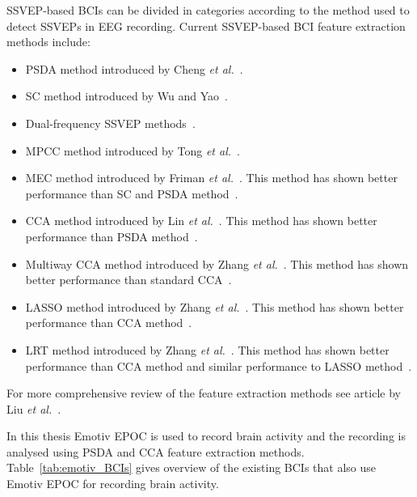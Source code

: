 \gls{SSVEP}-based \glspl{BCI} can be divided in categories according to the method used to detect \glspl{SSVEP} in \gls{EEG} recording. Current \gls{SSVEP}-based \gls{BCI} \gls{feature extraction} methods include:
\begin{itemize}
	\item \Gls{PSDA} method introduced by Cheng \textit{et al.}~\cite{psda}.
	\item \Gls{SC} method introduced by Wu and Yao~\cite{sc}.
	\item Dual-frequency \gls{SSVEP} methods~\cite{dual1, dual2}.
	\item \Gls{MPCC} method introduced by Tong \textit{et al.}~\cite{MPCC}.
	\item \Gls{MEC} method introduced by Friman \textit{et al.}~\cite{mec}. This method has shown better performance than \gls{SC} and \gls{PSDA} method~\cite{mec_comparison}.
	\item \Gls{CCA} method introduced by Lin \textit{et al.}~\cite{cca_lin}. This method has shown better performance than \gls{PSDA} method~\cite{cca_psda, bin2009cca, cca_lin}.
	\item Multiway \gls{CCA} method introduced by Zhang \textit{et al.}~\cite{mcca}. This method has shown better performance than standard \gls{CCA}~\cite{mcca}.
	\item \Gls{LASSO} method introduced by Zhang \textit{et al.}~\cite{LASSO}. This method has shown better performance than \gls{CCA} method~\cite{LASSO}.
	\item \Gls{LRT} method introduced by Zhang \textit{et al.}~\cite{LRT}. This method has shown better performance than \gls{CCA} method and similar performance to \gls{LASSO} method~\cite{LRT}.
\end{itemize}
For more comprehensive review of the \gls{feature extraction} methods see article by Liu \textit{et al.}~\cite{feature_extraction}.

In this thesis Emotiv EPOC is used to record brain activity and the recording is analysed using \gls{PSDA} and \gls{CCA} \gls{feature extraction} methods. Table~\ref{tab:emotiv_BCIs} gives overview of the existing \glspl{BCI} that also use Emotiv EPOC for recording brain activity.

\newcommand{\liu}{Liu \textit{et al.}~\cite{emotiv_11hz}}
\newcommand{\lin}{Lin \textit{et al.}~\cite{emotiv_walking}}
\newcommand{\choi}{Choi and Jo~\cite{emotiv_hybrid}}
\newcommand{\hvar}{Hvaring and}
\newcommand{\moe}{Ulltveit-Moe~\cite{emotiv_comparison}}
\newcommand{\duvi}{Duvinage \textit{et al.}~\cite{emotiv_p300_comp}}


